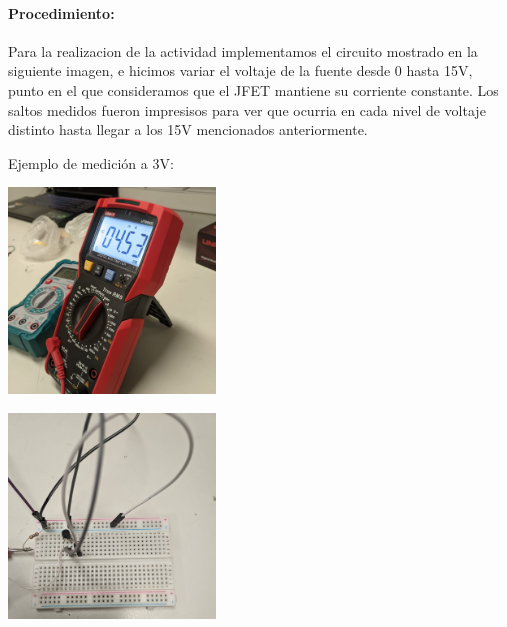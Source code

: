\paragraph{Procedimiento:}

Para la realizacion de la actividad implementamos el circuito mostrado en la siguiente imagen, e hicimos variar el voltaje de la fuente desde 0 hasta 15V, punto en el que consideramos que el JFET mantiene su corriente constante. Los saltos medidos fueron impresisos para ver que ocurria en cada nivel de voltaje distinto hasta llegar a los 15V mencionados anteriormente.


Ejemplo de medición a 3V:

\includegraphics[width=5.5cm]{./imagenes/Res1.jpg}

\includegraphics[width=5.5cm]{./imagenes/Lab1.jpg}


\begin{table}[ht]
\end{table}

